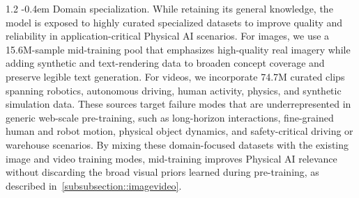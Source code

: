 \documentclass{llmxive}
\makeatletter
\providecommand{\paragraph}{  \@startsection{paragraph}{4}{\z@}    {1\baselineskip \@plus .2\baselineskip}    {-0.4em}    {\normalfont\normalsize\bfseries}}
\makeatother
\begin{document}
\paragraph{Domain specialization.}
While retaining its general knowledge, the model is exposed to highly curated specialized datasets to improve quality and reliability in application-critical Physical AI scenarios. For images, we use a 15.6M-sample mid-training pool that emphasizes high-quality real imagery while adding synthetic and text-rendering data to broaden concept coverage and preserve legible text generation. For videos, we incorporate 74.7M curated clips spanning robotics, autonomous driving, human activity, physics, and synthetic simulation data. These sources target failure modes that are underrepresented in generic web-scale pre-training, such as long-horizon interactions, fine-grained human and robot motion, physical object dynamics, and safety-critical driving or warehouse scenarios. By mixing these domain-focused datasets with the existing image and video training modes, mid-training improves Physical AI relevance without discarding the broad visual priors learned during pre-training, as described in~\cref{subsubsection::imagevideo}.
\end{document}
